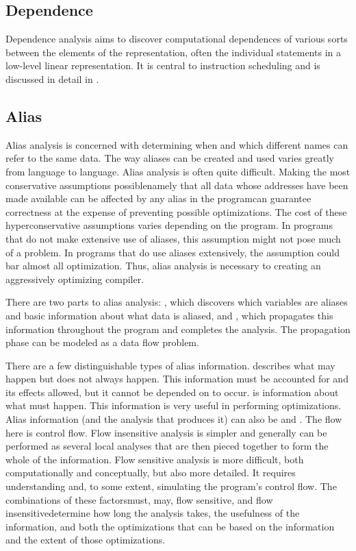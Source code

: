 \subsection{Dependence}
Dependence analysis aims to discover computational dependences of various sorts between the elements of the representation, often the individual statements in a low-level linear representation. It is central to instruction scheduling and is discussed in detail in .

\subsection{Alias}
Alias analysis is concerned with determining when and which different names can refer to the same data. The way aliases can be created and used varies greatly from language to language. Alias analysis is often quite difficult. Making the most conservative assumptions possible\empause namely that all data whose addresses have been made available can be affected by any alias in the program\empause can guarantee correctness at the expense of preventing possible optimizations. The cost of these hyperconservative assumptions varies depending on the program. In programs that do not make extensive use of aliases, this assumption might not pose much of a problem. In programs that do use aliases extensively, the assumption could bar almost all optimization. Thus, alias analysis is necessary to creating an aggressively optimizing compiler.

There are two parts to alias analysis: , which discovers which variables are aliases and basic information about what data is aliased, and , which propagates this information throughout the program and completes the analysis. The propagation phase can be modeled as a data flow problem.

There are a few distinguishable types of alias information.  describes what may happen but does not always happen. This information must be accounted for and its effects allowed, but it cannot be depended on to occur.  is information about what must happen. This information is very useful in performing optimizations. Alias information (and the analysis that produces it) can also be  and . The flow here is control flow. Flow insensitive analysis is simpler and generally can be performed as several local analyses that are then pieced together to form the whole of the information. Flow sensitive analysis is more difficult, both computationally and conceptually, but also more detailed. It requires understanding and, to some extent, simulating the program's control flow. The combinations of these factors\empause must, may, flow sensitive, and flow insensitive\empause determine how long the analysis takes, the usefulness of the information, and both the optimizations that can be based on the information and the extent of those optimizations.

